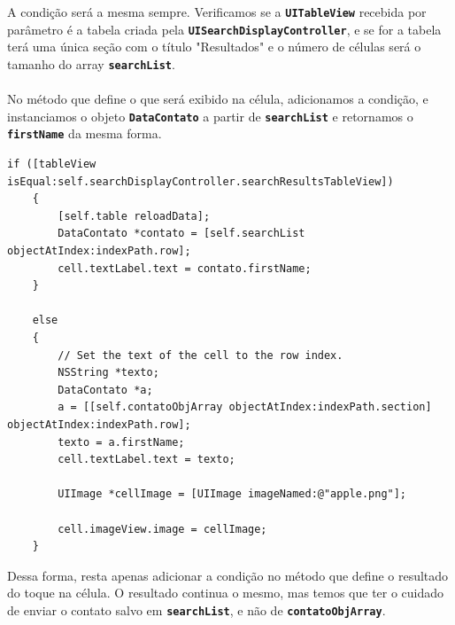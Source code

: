 \documentclass[a4paper,12pt,brazil,doubleside]{book}
\begin{document}
A condição será a mesma sempre. Verificamos se a \texttt{\textbf{UITableView}} recebida por parâmetro é a tabela criada pela \texttt{\textbf{UISearchDisplayController}}, e se for a tabela terá uma única seção com o título "Resultados" e o número de células será o tamanho do array \texttt{\textbf{searchList}}.
\paragraph{}No método que define o que será exibido na célula, adicionamos a condição, e instanciamos o objeto \texttt{\textbf{DataContato}} a partir de \texttt{\textbf{searchList}} e retornamos o \texttt{\textbf{firstName}} da mesma forma.

\begin{listing}
\begin{verbatim}
if ([tableView isEqual:self.searchDisplayController.searchResultsTableView])
    {
        [self.table reloadData];
        DataContato *contato = [self.searchList objectAtIndex:indexPath.row];
        cell.textLabel.text = contato.firstName;
    }
    
    else
    {
        // Set the text of the cell to the row index.
        NSString *texto;
        DataContato *a;
        a = [[self.contatoObjArray objectAtIndex:indexPath.section] objectAtIndex:indexPath.row];
        texto = a.firstName;
        cell.textLabel.text = texto;
        
        UIImage *cellImage = [UIImage imageNamed:@"apple.png"];
        
        cell.imageView.image = cellImage;
    }
\end{verbatim}
\end{listing}

Dessa forma, resta apenas adicionar a condição no método que define o resultado do toque na célula. O resultado continua o mesmo, mas temos que ter o cuidado de enviar o contato salvo em \texttt{\textbf{searchList}}, e não de \texttt{\textbf{contatoObjArray}}.
\end{document}
